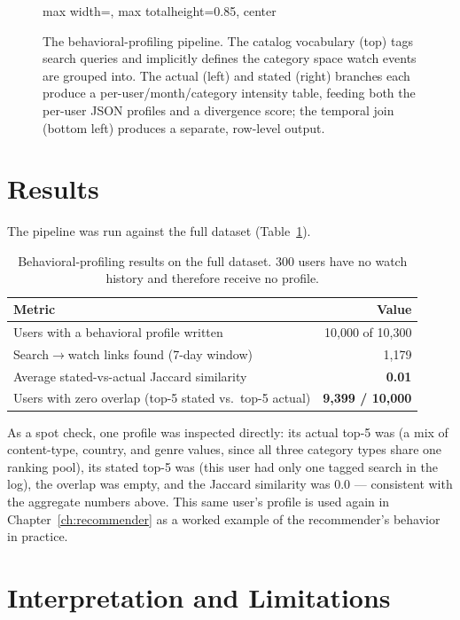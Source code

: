 \begin{figure}[H]
\begin{adjustbox}{max width=\textwidth, max totalheight=0.85\textheight, center}
\begin{tikzpicture}[node distance=1.0cm and 1.3cm]
\end{tikzpicture}
\end{adjustbox}
\caption{The behavioral-profiling pipeline. The catalog vocabulary (top) tags search queries and
implicitly defines the category space watch events are grouped into. The actual (left) and stated
(right) branches each produce a per-user/month/category intensity table, feeding both the per-user
JSON profiles and a divergence score; the temporal join (bottom left) produces a separate,
row-level output.}
\label{fig:behavior-pipeline}
\end{figure}

\section{Results}
\label{sec:behavior-results}

The pipeline was run against the full dataset (Table~\ref{tab:behavior-results}).

\begin{table}[H]
\centering
\begin{tabular}{lr}
\toprule
\textbf{Metric} & \textbf{Value} \\
\midrule
Users with a behavioral profile written & 10{,}000 of 10{,}300 \\
Search$\to$watch links found (7-day window) & 1{,}179 \\
Average stated-vs-actual Jaccard similarity & \textbf{0.01} \\
Users with zero overlap (top-5 stated vs.\ top-5 actual) & \textbf{9{,}399 / 10{,}000} \\
\bottomrule
\end{tabular}
\caption{Behavioral-profiling results on the full dataset. 300 users have no watch history and
therefore receive no profile.}
\label{tab:behavior-results}
\end{table}

As a spot check, one profile was inspected directly: its actual top-5 was  (a mix of content-type, country, and genre values, since all three
category types share one ranking pool), its stated top-5 was \code{["Action"]} (this user had only
one tagged search in the log), the overlap was empty, and the Jaccard similarity was $0.0$ ---
consistent with the aggregate numbers above. This same user's profile is used again in
Chapter~\ref{ch:recommender} as a worked example of the recommender's behavior in practice.

\section{Interpretation and Limitations}
\label{sec:behavior-limits}

